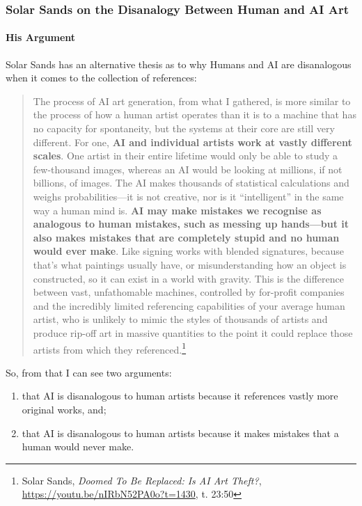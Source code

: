 \documentclass[11pt]{article}
\begin{document}
\subsubsection*{Solar Sands on the Disanalogy Between Human and AI Art}
\label{sec:org18be0db}
\paragraph*{His Argument}
\label{sec:org9d0120b}
Solar Sands has an alternative thesis as to why Humans and AI are disanalogous when it comes to the collection of references:
\begin{quote}
The process of AI art generation, from what I gathered, is more similar to the process of how a human artist operates than it is to a machine that has no capacity for spontaneity, but the systems at their core are still very different. For one, \textbf{AI and individual artists work at vastly different scales}. One artist in their entire lifetime would only be able to study a few-thousand images, whereas an AI would be looking at millions, if not billions, of images. The AI makes thousands of statistical calculations and weighs probabilities---it is not creative, nor is it ``intelligent'' in the same way a human mind is. \textbf{AI may make mistakes we recognise as analogous to human mistakes, such as messing up hands---but it also makes mistakes that are completely stupid and no human would ever make}. Like signing works with blended signatures, because that's what paintings usually have, or misunderstanding how an object is constructed, so it can exist in a world with gravity. This is the difference between vast, unfathomable machines, controlled by for-profit companies and the incredibly limited referencing capabilities of your average human artist, who is unlikely to mimic the styles of thousands of artists and produce rip-off art in massive quantities to the point it could replace those artists from which they referenced.\footnote{Solar Sands, \emph{Doomed To Be Replaced: Is AI Art Theft?}, \url{https://youtu.be/nIRbN52PA0o?t=1430}, t. 23:50}
\end{quote}

So, from that I can see two arguments:
\begin{enumerate}
\item that AI is disanalogous to human artists because it references vastly more original works, and;
\item that AI is disanalogous to human artists because it makes mistakes that a human would never make.
\end{enumerate}
\end{document}
